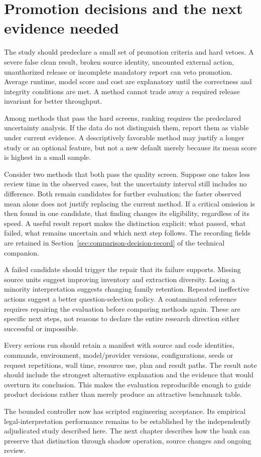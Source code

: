 \section{Promotion decisions and the next evidence needed}
\label{merge:M09:12}


The study should predeclare a small set of promotion criteria and hard vetoes.
A severe false clean result, broken source identity, uncounted external action,
unauthorized release or incomplete mandatory report can veto promotion. Average
runtime, model score and cost are explanatory until the correctness and integrity
conditions are met. A method cannot trade away a required release invariant for
better throughput.

Among methods that pass the hard screens, ranking requires the predeclared
uncertainty analysis. If the data do not distinguish them, report them as viable
under current evidence. A descriptively favorable method may justify a longer
study or an optional feature, but not a new default merely because its mean score
is highest in a small sample.

Consider two methods that both pass the quality screen. Suppose one takes less
review time in the observed cases, but the uncertainty interval still includes
no difference. Both remain candidates for further evaluation; the faster
observed mean alone does not justify replacing the current method. If a critical
omission is then found in one candidate, that finding changes its eligibility,
regardless of its speed. A useful result report makes the distinction explicit:
what passed, what failed, what remains uncertain and which next step follows.
The recording fields are retained in Section~\ref{sec:comparison-decision-record}
of the technical companion.


A failed candidate should trigger the repair that its failure supports. Missing
source units suggest improving inventory and extraction diversity. Losing a
minority interpretation suggests changing family retention. Repeated ineffective
actions suggest a better question-selection policy. A contaminated reference
requires repairing the evaluation before comparing methods again. These are
specific next steps, not reasons to declare the entire research direction either
successful or impossible.

Every serious run should retain a manifest with source and code identities,
commands, environment, model/provider versions, configurations, seeds or request
repetitions, wall time, resource use, plan and result paths. The result note should
include the strongest alternative explanation and the evidence that would overturn
its conclusion. This makes the evaluation reproducible enough to guide product
decisions rather than merely produce an attractive benchmark table.

The bounded controller now has scripted engineering acceptance. Its
empirical legal-interpretation performance remains to be established by
the independently adjudicated study described here. The next chapter describes how the bank
can preserve that distinction through shadow operation, source changes and
ongoing review.
